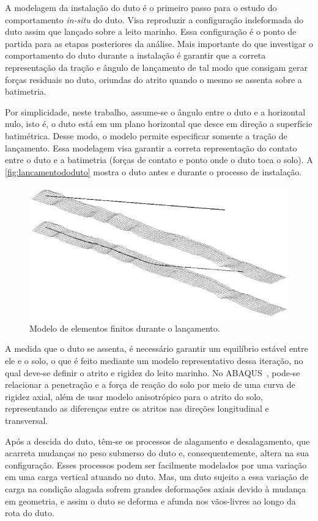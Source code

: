 A modelagem da instalação do duto é o primeiro passo para o estudo do comportamento \textit{in-situ} do duto. Visa reproduzir a configuração indeformada do duto assim que lançado sobre a leito marinho.
Essa configuração é o ponto de partida para as etapas posteriores da análise.
Mais importante do que investigar o comportamento do duto durante a instalação é garantir que a correta representação da tração e ângulo de lançamento de tal modo que consigam gerar forças residuais no duto, oriundas do atrito quando o mesmo se assenta sobre a batimetria.

Por simplicidade, neste trabalho, assume-se o ângulo entre o duto e a horizontal nulo, isto é, o duto está em um plano horizontal que desce em direção a superfície batimétrica.
Desse modo, o modelo permite especificar somente a tração de lançamento.
Essa modelagem visa garantir a correta representação do contato entre o duto e a batimetria (forças de contato e ponto onde o duto toca o solo).
A \autoref{fig:lancamentododuto} mostra o duto antes e durante o processo de instalação.

\begin{figure}[!ht]
    \centering
    \caption{Modelo de elementos finitos durante o lançamento.}\label{fig:lancamentododuto}
    \includegraphics[width=0.7\linewidth]{imagens/lancamento_do_duto}
\end{figure}

A medida que o duto se assenta, é necessário garantir um equilíbrio estável entre ele e o solo, o que é feito mediante um modelo representativo dessa iteração, no qual deve-se definir o atrito e rigidez do leito marinho.
No ABAQUS~\cite{Dassault2018}, pode-se relacionar a penetração e a força de reação do solo por meio de uma curva de rigidez axial, além de usar modelo anisotrópico para o atrito do solo, representando as diferenças entre os atritos nas direções longitudinal e transversal.

Após a descida do duto, têm-se os processos de alagamento e desalagamento, que acarreta mudanças no peso submerso do duto e, consequentemente, altera na sua configuração.
Esses processos podem ser facilmente modelados por uma variação em uma carga vertical atuando no duto.
Mas, um duto sujeito a essa variação de carga na condição alagada sofrem grandes deformações axiais devido à mudança em geometria, e assim o duto se deforma e afunda nos vãos-livres ao longo da rota do duto.

